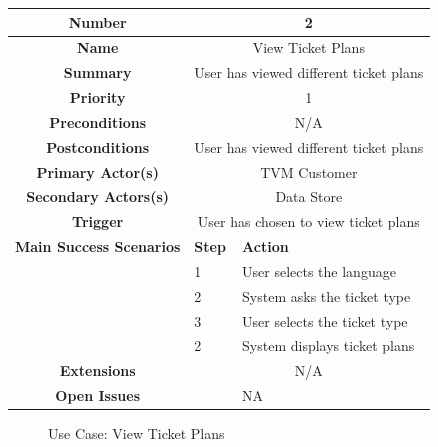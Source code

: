 \documentclass[a4paper,12pt]{report}
\begin{document}
\begin{tabular}{ | c | p{2cm} | p{7cm} |}
	
	\hline
	\textbf{Number} & \multicolumn{2}{c|}{2}  \\
	\hline
	\textbf{Name} & \multicolumn{2}{c|}{View Ticket Plans}  \\
	\hline
	\textbf{Summary} & \multicolumn{2}{c|}{User has viewed different ticket plans}  \\
	\hline
	\textbf{Priority} & \multicolumn{2}{c|}{1}  \\
	\hline
	\textbf{Preconditions} & \multicolumn{2}{c|}{N/A}  \\
	\hline
	\textbf{Postconditions} & \multicolumn{2}{c|}{User has viewed different ticket plans}  \\
	\hline
	\textbf{Primary Actor(s)} & \multicolumn{2}{c|}{TVM Customer}  \\
	\hline
	\textbf{Secondary Actors(s)} & \multicolumn{2}{c|}{Data Store}  \\
	\hline
	\textbf{Trigger} & \multicolumn{2}{c|}{User has chosen to view ticket plans}  \\
	\hline
	\textbf{Main Success Scenarios} & \textbf{Step} & \textbf{Action} \\
	\hline
	& 1 & User selects the language \\ 
	\hline
	&  2  & System asks the ticket type \\
	\hline
	&  3  & User selects the ticket type \\
	\hline
	&  2  & System displays ticket plans \\
	\hline
	\textbf{Extensions} & \multicolumn{2}{c|}{N/A}  \\
	\hline
	\textbf{Open Issues} &    & NA \\
	\hline
	
\end{tabular}

\begin{figure}[!htb]
	\caption{\label{fig:uc_view_ticket_plans : }Use Case: View Ticket Plans}	
\end{figure}
\end{document}
